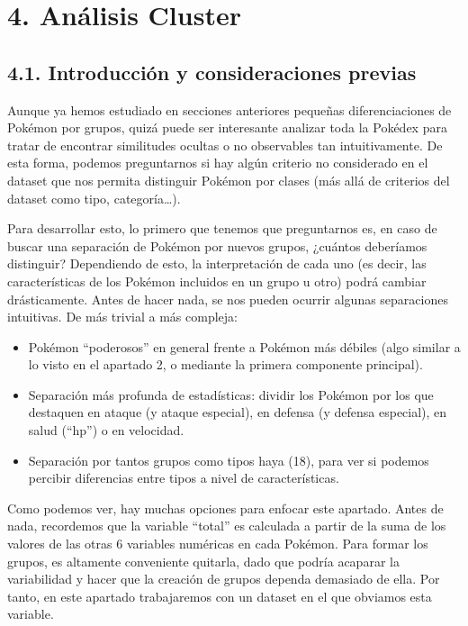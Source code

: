 \documentclass[
  11.8pt,
]{extreport}
\begin{document}
\chapter{4. Análisis Cluster}\label{anuxe1lisis-cluster}

\section{4.1. Introducción y consideraciones
previas}\label{introducciuxf3n-y-consideraciones-previas}

Aunque ya hemos estudiado en secciones anteriores pequeñas
diferenciaciones de Pokémon por grupos, quizá puede ser interesante
analizar toda la Pokédex para tratar de encontrar similitudes ocultas o
no observables tan intuitivamente. De esta forma, podemos preguntarnos
si hay algún criterio no considerado en el dataset que nos permita
distinguir Pokémon por clases (más allá de criterios del dataset como
tipo, categoría\ldots).

Para desarrollar esto, lo primero que tenemos que preguntarnos es, en
caso de buscar una separación de Pokémon por nuevos grupos, ¿cuántos
deberíamos distinguir? Dependiendo de esto, la interpretación de cada
uno (es decir, las características de los Pokémon incluidos en un grupo
u otro) podrá cambiar drásticamente. Antes de hacer nada, se nos pueden
ocurrir algunas separaciones intuitivas. De más trivial a más compleja:

\begin{itemize}
\item
  Pokémon ``poderosos'' en general frente a Pokémon más débiles (algo
  similar a lo visto en el apartado 2, o mediante la primera componente
  principal).
\item
  Separación más profunda de estadísticas: dividir los Pokémon por los
  que destaquen en ataque (y ataque especial), en defensa (y defensa
  especial), en salud (``hp'') o en velocidad.
\item
  Separación por tantos grupos como tipos haya (18), para ver si podemos
  percibir diferencias entre tipos a nivel de características.
\end{itemize}

Como podemos ver, hay muchas opciones para enfocar este apartado. Antes
de nada, recordemos que la variable ``total'' es calculada a partir de
la suma de los valores de las otras 6 variables numéricas en cada
Pokémon. Para formar los grupos, es altamente conveniente quitarla, dado
que podría acaparar la variabilidad y hacer que la creación de grupos
dependa demasiado de ella. Por tanto, en este apartado trabajaremos con
un dataset en el que obviamos esta variable.
\end{document}
